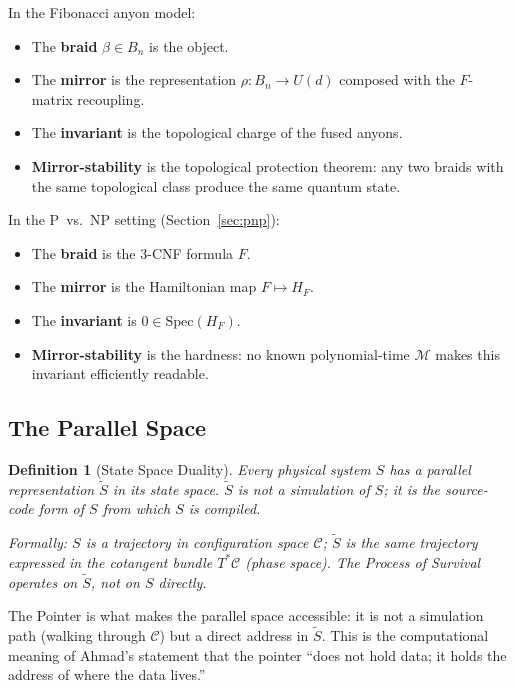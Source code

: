 \documentclass[11pt,letterpaper]{article}
\newtheorem{definition}[theorem]{Definition}
\begin{document}
In the Fibonacci anyon model:
\begin{itemize}[nosep]
\item The \textbf{braid} $\beta \in B_n$ is the object.
\item The \textbf{mirror} is the representation $\rho: B_n \to U(d)$ composed
  with the $F$-matrix recoupling.
\item The \textbf{invariant} is the topological charge of the fused anyons.
\item \textbf{Mirror-stability} is the topological protection theorem: any
  two braids with the same topological class produce the same quantum state.
\end{itemize}

In the P~vs.~NP setting (Section~\ref{sec:pnp}):
\begin{itemize}[nosep]
\item The \textbf{braid} is the 3-CNF formula $F$.
\item The \textbf{mirror} is the Hamiltonian map $F \mapsto H_F$.
\item The \textbf{invariant} is $0 \in \mathrm{Spec}(H_F)$.
\item \textbf{Mirror-stability} is the hardness: no known polynomial-time $\mathcal{M}$
  makes this invariant efficiently readable.
\end{itemize}

\subsection{The Parallel Space}

\begin{definition}[State Space Duality]
Every physical system $S$ has a \emph{parallel representation} $\tilde{S}$
in its state space.  $\tilde{S}$ is not a simulation of $S$; it is the
source-code form of $S$ from which $S$ is compiled.

Formally: $S$ is a trajectory in configuration space $\mathcal{C}$;
$\tilde{S}$ is the same trajectory expressed in the cotangent bundle
$T^*\mathcal{C}$ (phase space).  The Process of Survival operates on
$\tilde{S}$, not on $S$ directly.
\end{definition}

The Pointer is what makes the parallel space accessible: it is not a
simulation path (walking through $\mathcal{C}$) but a direct address in
$\tilde{S}$.  This is the computational meaning of Ahmad's statement that
the pointer ``does not hold data; it holds the address of where the data
lives.''
\end{document}
